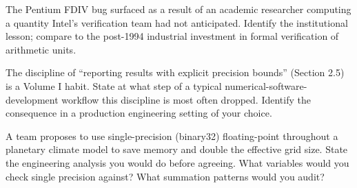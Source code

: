 \begin{exercise}
The Pentium FDIV bug \cite{paper:coe-tang-pratt-1995} surfaced as a result of an academic researcher computing a quantity Intel's verification team had not anticipated. Identify the institutional lesson; compare to the post-1994 industrial investment in formal verification of arithmetic units.
\end{exercise}

\begin{exercise}
The discipline of ``reporting results with explicit precision bounds'' (Section 2.5) is a Volume I habit. State at what step of a typical numerical-software-development workflow this discipline is most often dropped. Identify the consequence in a production engineering setting of your choice.
\end{exercise}

\begin{exercise}
A team proposes to use single-precision (binary32) floating-point throughout a planetary climate model to save memory and double the effective grid size. State the engineering analysis you would do before agreeing. What variables would you check single precision against? What summation patterns would you audit?
\end{exercise}
